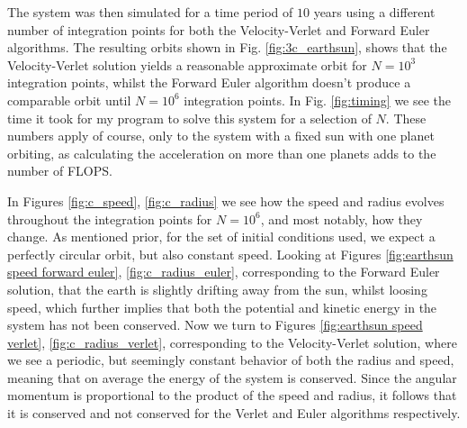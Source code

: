 \documentclass[10pt,showpacs,preprintnumbers,footinbib,amsmath,amssymb,aps,prl,twocolumn,groupedaddress,superscriptaddress,showkeys]{revtex4-1}
\begin{document}
    The system was then simulated for a time period of $10$ years using a different number of integration points for both the Velocity-Verlet and Forward Euler algorithms. The resulting orbits shown in Fig. \ref{fig:3c_earthsun}, shows that the Velocity-Verlet solution yields a reasonable approximate orbit for $N=10^3$ integration points, whilst the Forward Euler algorithm doesn't produce a comparable orbit until $N=10^6$ integration points. In Fig. \ref{fig:timing} we see the time it took for my program to solve this system for a selection of $N$. These numbers apply of course, only to the system with a fixed sun with one planet orbiting, as calculating the acceleration on more than one planets adds to the number of FLOPS.

    In Figures \ref{fig:c_speed}, \ref{fig:c_radius} we see how the speed and radius evolves throughout the integration points for $N=10^6$, and most notably, how they change. As mentioned prior, for the set of initial conditions used, we expect a perfectly circular orbit, but also constant speed. Looking at Figures \ref{fig:earthsun speed forward euler}, \ref{fig:c_radius_euler}, corresponding to the Forward Euler solution, that the earth is slightly drifting away from the sun, whilst loosing speed, which further implies that both the potential and kinetic energy in the system has not been conserved. Now we turn to Figures \ref{fig:earthsun speed verlet}, \ref{fig:c_radius_verlet}, corresponding to the Velocity-Verlet solution, where we see a periodic, but seemingly constant behavior of both the radius and speed, meaning that on average the energy of the system is conserved. Since the angular momentum is proportional to the product of the speed and radius, it follows that it is conserved and not conserved for the Verlet and Euler algorithms respectively.
\end{document}
